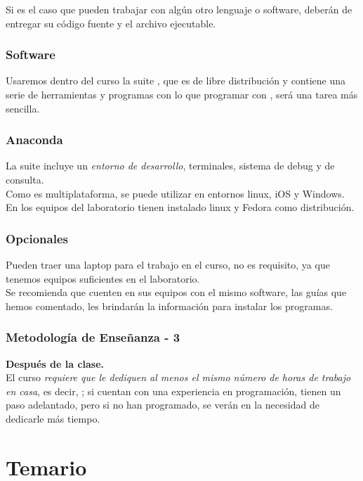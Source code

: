 \begin{frame}
Si es el caso que pueden trabajar con algún otro lenguaje o software, deberán de entregar su código fuente y el archivo ejecutable.
\end{frame}
\begin{frame}
\frametitle{Software}
Usaremos dentro del curso la suite , que es de libre distribución y contiene una serie de herramientas y programas con lo que programar con , será una tarea más sencilla.
\end{frame}
\begin{frame}
\frametitle{Anaconda}
La suite incluye un \emph{entorno de desarrollo}, terminales, sistema de debug y de consulta.
\\
\bigskip
Como es multiplataforma, se puede utilizar en entornos linux, iOS y Windows. En los equipos del laboratorio tienen instalado linux y Fedora como distribución.
\end{frame}
\begin{frame}
\frametitle{Opcionales}
Pueden traer una laptop para el trabajo en el curso, no es requisito, ya que tenemos equipos suficientes en el laboratorio.
\\
\medskip
Se recomienda que cuenten en sus equipos con el mismo software, las guías que hemos comentado, les brindarán la información para instalar los programas.
\end{frame}
\begin{frame}
\frametitle{Metodología de Enseñanza - 3}
\textbf{Después de la clase.}
\\
\medskip
El curso \emph{requiere que le dediquen al menos el mismo número de horas de trabajo en casa}, es decir, ; si cuentan con una experiencia en programación, tienen un paso adelantado, pero si no han programado, se verán en la necesidad de dedicarle más tiempo.
\end{frame}
\section{Temario}
